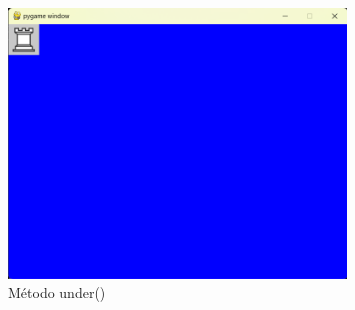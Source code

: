 \documentclass{article}
\begin{document}
\begin{itemize}
\begin{figure}[H]
      \includegraphics[width=0.8\textwidth, keepaspectratio]{img/under.png}
      \caption{Método under()}
    \end{figure}
  \end{itemize}
  
\end{document}
